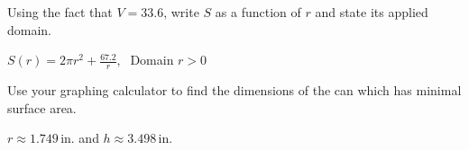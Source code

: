 \documentclass{ximera}
\begin{document}
\begin{question}
Using the fact that $V = 33.6$, write $S$ as a function of $r$ and state its applied domain.
\begin{solution}
$S(r) = 2\pi r^{2} + \frac{67.2}{r}, \;$  Domain $r > 0$
\end{solution}

\end{question}

\begin{question}
Use your graphing calculator to find the dimensions of the can which has minimal surface area.
\begin{solution}
$r \approx 1.749\,$in. and $h \approx 3.498\,$in.
\end{solution}

\end{question}
\end{document}
